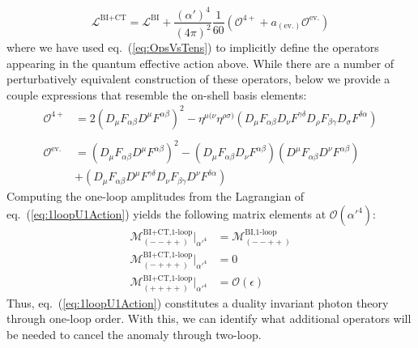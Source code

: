 \documentclass[11pt,letter]{article}
\def\eqn#1{eq.~(\ref{#1})}
\begin{document}
\begin{equation}
\label{eq:1loopU1Action}
\mathcal{L}^{\text{BI}+\text{CT}} = \mathcal{L}^{\text{BI}} + \frac{(\alpha')^4}{(4\pi)^2}\frac{1}{60}\left(\mathcal{O}^{4+}+ a_{({\text{ev.}})}\mathcal{O}^{\text{ev.}}\right)
\end{equation}
where we have used \eqn{eq:OpsVsTens} to implicitly define the operators appearing in the quantum effective action above. While there are a number of perturbatively equivalent construction of these operators, below we provide a couple expressions that resemble the on-shell basis elements:
\begin{equation}
\begin{split} 
\mathcal{O}^{4+} &= 2 (D_\mu F_{\alpha \beta} D^\mu  F^{\alpha \beta})^2 - \eta^{\mu(\nu}\eta^{\rho\sigma)}(D_\mu F_{\alpha \beta} D_\nu  F^{\gamma\delta} D_\rho F_{\beta \gamma } D_\sigma F^{\delta \alpha})
\\\\
\mathcal{O}^{\text{ev.}} &= 
(D_\mu F_{\alpha \beta} D^\mu  F^{\alpha \beta})^2 - (D_\mu F_{\alpha \beta} D_\nu  F^{\alpha \beta})(D^\mu F_{\alpha \beta} D^\nu  F^{\alpha \beta})
\\
&+(D_\mu F_{\alpha \beta} D^\mu  F^{\gamma\delta} D_\nu F_{\beta \gamma } D^\nu F^{\delta \alpha})
\end{split}
\end{equation}
Computing the one-loop amplitudes from the Lagrangian of \eqn{eq:1loopU1Action} yields the following matrix elements at $\mathcal{O}(\alpha'^4)$:
\begin{align}
\mathcal{M}^{\text{BI+CT,1-loop}}_{(--++)}\big|_{\alpha'^4} &= \mathcal{M}^{\text{BI,1-loop}}_{(--++)}  
\\
 \mathcal{M}^{\text{BI+CT,1-loop}}_{(-+++)}\big|_{\alpha'^4} &= 0
 \\
 \mathcal{M}^{\text{BI+CT,1-loop}}_{(++++)}\big|_{\alpha'^4}  &= \mathcal{O}(\epsilon)
\end{align}
Thus, \eqn{eq:1loopU1Action} constitutes a duality invariant photon theory through one-loop order. With this, we can identify what additional operators will be needed to cancel the anomaly through two-loop. 
\end{document}
